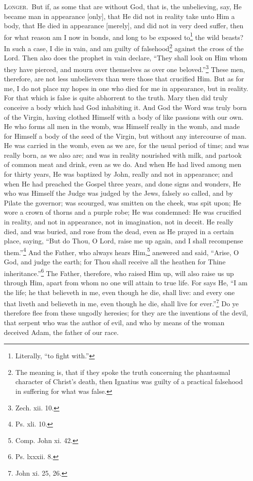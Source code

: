 \textsc{Longer.}~But if, as some that are without God, that is, the unbelieving, say, He became man in appearance [only], that He did not in reality take unto Him a body, that He died in appearance [merely], and did not in very deed suffer, then for what reason am I now in bonds, and long to be exposed to\footnote{Literally, “to fight with.”} the wild beasts? In such a case, I die in vain, and am guilty of falsehood\footnote{The meaning is, that if they spoke the truth concerning the phantasmal character of Christ’s death, then Ignatius was guilty of a practical falsehood in suffering for what was false.} against the cross of the Lord. Then also does the prophet in vain declare, “They shall look on Him whom they have pierced, and mourn over themselves as over one beloved.”\footnote{Zech. xii. 10.} These men, therefore, are not less unbelievers than were those that crucified Him. But as for me, I do not place my hopes in one who died for me in appearance, but in reality. For that which is false is quite abhorrent to the truth. Mary then did truly conceive a body which had God inhabiting it. And God the Word was truly born of the Virgin, having clothed Himself with a body of like passions with our own. He who forms all men in the womb, was Himself really in the womb, and made for Himself a body of the seed of the Virgin, but without any intercourse of man. He was carried in the womb, even as we are, for the usual period of time; and was really born, as we also are; and was in reality nourished with milk, and partook of common meat and drink, even as we do. And when He had lived among men for thirty years, He was baptized by John, really and not in appearance; and when He had preached the Gospel three years, and done signs and wonders, He who was Himself the Judge was judged by the Jews, falsely so called, and by Pilate the governor; was scourged, was smitten on the cheek, was spit upon; He wore a crown of thorns and a purple robe; He was condemned: He was crucified in reality, and not in appearance, not in imagination, not in deceit. He really died, and was buried, and rose from the dead, even as He prayed in a certain place, saying, “But do Thou, O Lord, raise me up again, and I shall recompense them.”\footnote{Ps. xli. 10.} And the Father, who always hears Him,\footnote{Comp. John xi. 42.} answered and said, “Arise, O God, and judge the earth; for Thou shall receive all the heathen for Thine inheritance.”\footnote{Ps. lxxxii. 8.} The Father, therefore, who raised Him up, will also raise us up through Him, apart from whom no one will attain to true life. For says He, “I am the life; he that believeth in me, even though he die, shall live: and every one that liveth and believeth in me, even though he die, shall live for ever.”\footnote{John xi. 25, 26.} Do ye therefore flee from these ungodly heresies; for they are the inventions of the devil, that serpent who was the author of evil, and who by means of the woman deceived Adam, the father of our race.

